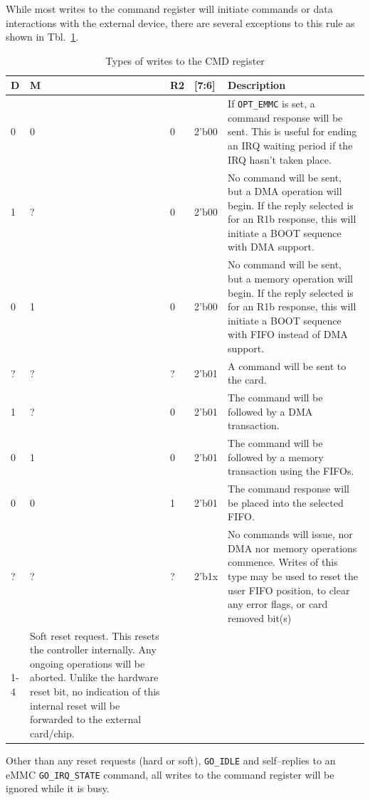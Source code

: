 \documentclass{gqtekspec}
\begin{document}
While most writes to the command register will initiate commands or data
interactions with the external device, there are several exceptions to this
rule as shown in Tbl.~\ref{tbl:CMD-BITS}.
\begin{table}\begin{center}
\begin{tabular}{|p{0.36in}|p{0.36in}|p{0.36in}|p{0.36in}|p{4.0in}|}\hline
	\rowcolor[gray]{0.85} D & M & R2 & [7:6] & Description\\\hline\hline
0 & 0 & 0 & 2'b00 & If {\tt OPT\_EMMC} is set, a command response will be
	sent.  This is useful for ending an IRQ waiting period if the IRQ
	hasn't taken place. \\
1 & ? & 0 & 2'b00 & No command will be sent, but a DMA operation will
	begin. If the reply selected is for an R1b response, this will
	initiate a BOOT sequence with DMA support.\\
0 & 1 & 0 & 2'b00 & No command will be sent, but a memory operation will
	begin.  If the reply selected is for an R1b response, this will
	initiate a BOOT sequence with FIFO instead of DMA support. \\
? & ? & ? & 2'b01 & A command will be sent to the card. \\
1 & ? & 0 & 2'b01 & The command will be followed by a DMA transaction. \\
0 & 1 & 0 & 2'b01 & The command will be followed by a memory transaction
	using the FIFOs. \\
0 & 0 & 1 & 2'b01 & The command response will be placed into the selected
	FIFO. \\
? & ? & ? & 2'b1x & No commands will issue, nor DMA nor memory operations
	commence.  Writes of this type may be used to reset the user FIFO
	position, to clear any error flags, or card removed bit(s)\\\cline{1-4}
\multicolumn{4}{|c|}{{\tt 32'h5200\_0000}} & Soft reset request.  This
	resets the controller internally.  Any ongoing operations will be
	aborted.  Unlike the hardware reset bit, no indication of this internal
	reset will be forwarded to the external card/chip.  \\\hline
\end{tabular}
\caption{Types of writes to the CMD register}\label{tbl:CMD-BITS}
\end{center}\end{table}
Other than any reset requests (hard or soft), {\tt GO\_IDLE} and self--replies
to an eMMC {\tt GO\_IRQ\_STATE} command, all writes to the command register
will be ignored while it is busy.
\end{document}
